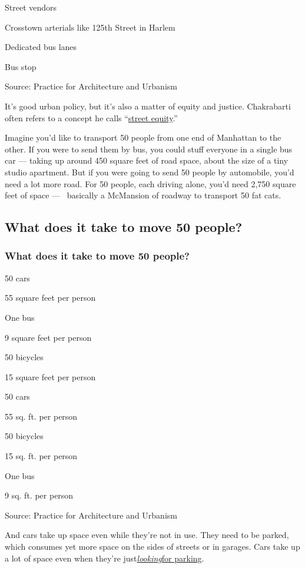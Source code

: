 Street vendors

Crosstown arterials like 125th Street in Harlem

Dedicated bus lanes

Bus stop

Source: Practice for Architecture and Urbanism

It's good urban policy, but it's also a matter of equity and justice.
Chakrabarti often refers to a concept he calls
``\href{https://twitter.com/vishaannyca/status/1180833269367136264}{street
equity}.''

Imagine you'd like to transport 50 people from one end of Manhattan to
the other. If you were to send them by bus, you could stuff everyone in
a single bus car --- taking up around 450 square feet of road space,
about the size of a tiny studio apartment. But if you were going to send
50 people by automobile, you'd need a lot more road. For 50 people, each
driving alone, you'd need 2,750 square feet of space ---~ basically a
McMansion of roadway to transport 50 fat cats.

\hypertarget{what-does-it-take-to-move-50-people}{%
\subsection{What does it take to move 50
people?}\label{what-does-it-take-to-move-50-people}}

\hypertarget{what-does-it-take-to-move-50-people-1}{%
\subsubsection{What does it take to move 50
people?}\label{what-does-it-take-to-move-50-people-1}}

50 cars

55 square feet per person

One bus

9 square feet per person

50 bicycles

15 square feet per person

50 cars

55 sq. ft. per person

50 bicycles

15 sq. ft. per person

One bus

9 sq. ft. per person

Source: Practice for Architecture and Urbanism

And cars take up space even while they're not in use. They need to be
parked, which consumes yet more space on the sides of streets or in
garages. Cars take up a lot of space even when they're
just\href{http://shoup.luskin.ucla.edu/wp-content/uploads/sites/2/2015/02/CruisingForParkingAccess.pdf}{}\href{http://shoup.luskin.ucla.edu/wp-content/uploads/sites/2/2015/02/CruisingForParkingAccess.pdf}{\emph{looking}}\href{http://shoup.luskin.ucla.edu/wp-content/uploads/sites/2/2015/02/CruisingForParkingAccess.pdf}{for
parking}.

